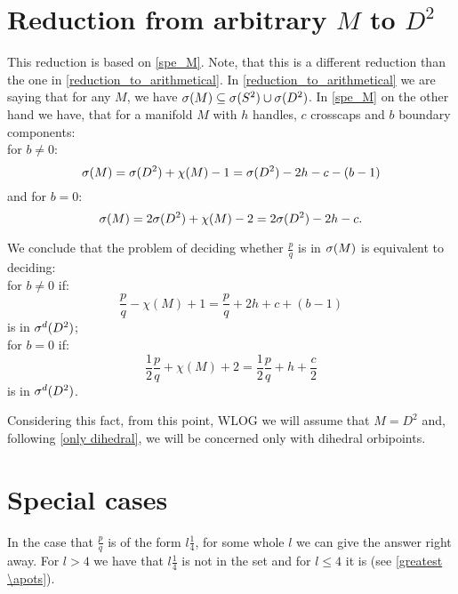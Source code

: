 \section{Reduction from arbitrary $M$ to $D^2$}\label{algorithm reduction to D2}
This reduction is based on \ref{spe_M}.
Note, that this is a different reduction than the one in \ref{reduction_to_arithmetical}. 
In \ref{reduction_to_arithmetical} we are saying that for any $M$, we have ${{\sigma}(M)} 
\subseteq {{\sigma}(S^2)} \cup {{\sigma}(D^2)}$. In \ref{spe_M} on the other hand we have, that 
for a manifold $M$ with $h$ handles, $c$ crosscaps and $b$ boundary components: \\
for $b \neq 0$:
\begin{equation}
{\sigma}(M) = {{\sigma}(D^2)} + \chi(M) -1 = {{\sigma}(D^2)} - 2h - c - (b - 1)
\end{equation}
and for $b = 0$:
\begin{equation}
{\sigma}(M) = 2{{\sigma}(D^2)} + \chi(M) - 2 = 2{{\sigma}(D^2)} - 2h - c.
\end{equation}  


We conclude that the problem of deciding whether $\frac{p}{q}$ is in ${\sigma}(M)$
is equivalent to deciding: \\
for $b \neq 0$ if:
\begin{equation}\label{translation with b not 0}
\frac{p}{q} - \chi(M) + 1 = \frac{p}{q} + 2h + c + (b-1) 
\end{equation} 
is in ${\sigma^d(D^2)}$; \\
for $b = 0$ if:
\begin{equation}\label{translation with b 0}
\frac{1}{2}\frac{p}{q} + \chi(M) + 2 = \frac{1}{2}\frac{p}{q}+h+\frac{c}{2}
\end{equation}
is in ${\sigma^d(D^2)}$.

Considering this fact, from this point, WLOG we will assume that $M = D^2$ and, 
following \ref{only dihedral}, we will 
be concerned only with dihedral orbipoints.


\section{Special cases}
In the case that $\frac{p}{q}$ is of the form $l\frac{1}{4}$, for some whole $l$ 
we can give the answer right away. For $l > 4$ we have that $l\frac{1}{4}$ is not in the set 
and for $l \leq 4$ it is (see \ref{greatest \apots}). 

